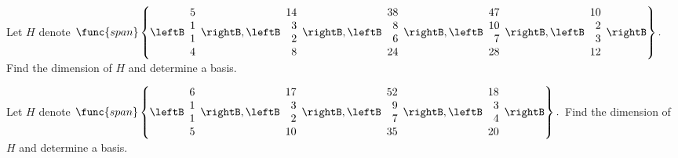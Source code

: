 \begin{enumialphparenastyle}
\begin{ex} Let $H$ denote $\func{span}\left\{ \leftB 
\begin{array}{r}
5 \\ 
1 \\ 
1 \\ 
4
\end{array}
\rightB ,\leftB 
\begin{array}{r}
14 \\ 
3 \\ 
2 \\ 
8
\end{array}
\rightB ,\leftB 
\begin{array}{r}
38 \\ 
8 \\ 
6 \\ 
24
\end{array}
\rightB ,\leftB 
\begin{array}{r}
47 \\ 
10 \\ 
7 \\ 
28
\end{array}
\rightB ,\leftB 
\begin{array}{r}
10 \\ 
2 \\ 
3 \\ 
12
\end{array}
\rightB \right\} .$ Find the dimension of $H$ and determine a basis.
\end{ex}

\begin{ex} Let $H$ denote $\func{span}\left\{ \leftB 
\begin{array}{r}
6 \\ 
1 \\ 
1 \\ 
5
\end{array}
\rightB ,\leftB 
\begin{array}{r}
17 \\ 
3 \\ 
2 \\ 
10
\end{array}
\rightB ,\leftB 
\begin{array}{r}
52 \\ 
9 \\ 
7 \\ 
35
\end{array}
\rightB ,\leftB 
\begin{array}{r}
18 \\ 
3 \\ 
4 \\ 
20
\end{array}
\rightB \right\} .$ Find the dimension of $H$ and determine a basis.
\end{ex}


\end{enumialphparenastyle}
